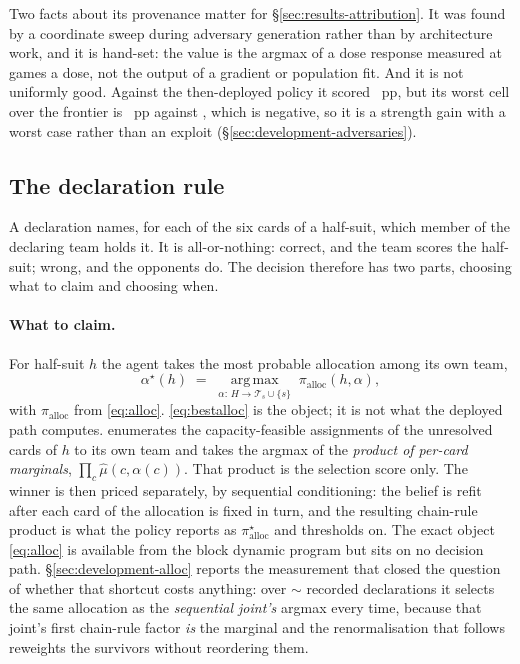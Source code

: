 Two facts about its provenance matter for \S\ref{sec:results-attribution}. It was found by a
coordinate sweep during adversary generation rather than by architecture work, and it is hand-set:
the value \texttt{\vsevenContestWeight{}} is the argmax of a dose response measured at
\vsevenPhaseTwoCell{} games a dose, not the output of a gradient or population fit. And it is not
uniformly good. Against the then-deployed policy it scored \vsevenOneSwitchArm{}~pp, but its worst
cell over the \vsix{} frontier is \vsevenOneSwitchArmWorst{}~pp against
\texttt{\vsevenOneSwitchArmWorstOpp{}}, which is negative, so it is a strength gain with a worst case
rather than an exploit (\S\ref{sec:development-adversaries}).

\subsection{The declaration rule}
\label{sec:agent-declare}

A declaration names, for each of the six cards of a half-suit, which member of the declaring team
holds it. It is all-or-nothing: correct, and the team scores the half-suit; wrong, and the opponents
do. The decision therefore has two parts, choosing what to claim and choosing when.

\paragraph{What to claim.} For half-suit $h$ the agent takes the most probable allocation among its
own team,
\begin{equation}
  \alpha^\star(h) \;=\; \operatorname*{arg\,max}_{\alpha:\,H \to \mathcal{T}_s \cup \{s\}}
  \; \pi_{\mathrm{alloc}}(h,\alpha),
  \label{eq:bestalloc}
\end{equation}
with $\pi_{\mathrm{alloc}}$ from \eqref{eq:alloc}. \eqref{eq:bestalloc} is the object; it is not what the deployed path computes.
\sestina{} enumerates the capacity-feasible assignments of the unresolved cards of $h$ to its own
team and takes the argmax of the \emph{product of per-card marginals},
$\prod_{c} \hat\mu(c,\alpha(c))$. That product is the selection score only. The winner is then priced
separately, by sequential conditioning: the belief is refit after each card of the allocation is
fixed in turn, and the resulting chain-rule product is what the policy reports as
$\pi^\star_{\mathrm{alloc}}$ and thresholds on. The exact
object \eqref{eq:alloc} is available from the block dynamic program but sits on no decision path. \S\ref{sec:development-alloc} reports the
measurement that closed the question of whether that shortcut costs anything: over
$\sim$\vsevenLoneDecls{} recorded declarations it selects the same allocation as the \emph{sequential joint's} argmax every time, because that
joint's first chain-rule factor \emph{is} the marginal and
the renormalisation that follows reweights the survivors without reordering them.

